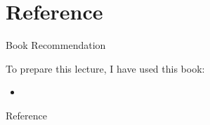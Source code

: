 \documentclass[handout]{beamer} %
\begin{document}
\section{Reference}

\begin{frame}{Book Recommendation}

To prepare this lecture, I have used this book:
\begin{itemize}
	\item {}
\end{itemize}

\end{frame}


\begin{frame}[allowframebreaks]{Reference}

	
\end{frame}





	
\end{document}
